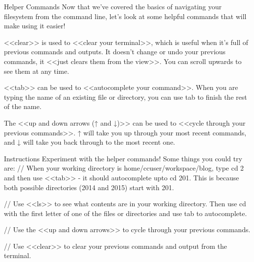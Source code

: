 Helper Commands
    Now that we’ve covered the basics of navigating your filesystem from the command line, let’s look at some helpful commands that will make using it easier!

    <<clear>> is used to <<clear your terminal>>, which is useful when it’s full of previous commands and outputs. It doesn’t change or undo your previous commands, it <<just clears them from the view>>. You can scroll upwards to see them at any time.

    <<tab>> can be used to <<autocomplete your command>>. When you are typing the name of an existing file or directory, you can use tab to finish the rest of the name.

    The <<up and down arrows (↑ and ↓)>> can be used to <<cycle through your previous commands>>. ↑ will take you up through your most recent commands, and ↓ will take you back through to the most recent one.

Instructions
    Experiment with the helper commands! Some things you could try are:
        // When your working directory is home/ccuser/workspace/blog, type cd 2 and then use <<tab>> - it should autocomplete upto cd 201. This is because both possible directories (2014 and 2015) start with 201.

        // Use <<ls>> to see what contents are in your working directory. Then use cd with the first letter of one of the files or directories and use tab to autocomplete.
        
        // Use the <<up and down arrows>> to cycle through your previous commands.

        // Use <<clear>> to clear your previous commands and output from the terminal.
